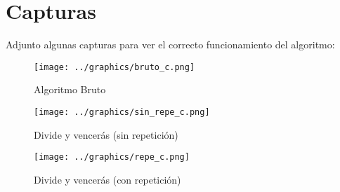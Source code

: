\documentclass[11pt]{article}
\begin{document}
\section{Capturas}
Adjunto algunas capturas para ver el correcto funcionamiento del algoritmo:

\begin{figure}[h]
\centering
\texttt{[image: ../graphics/bruto\_c.png]}
\caption{Algoritmo Bruto}
\end{figure}

\begin{figure}[h]
\centering
\texttt{[image: ../graphics/sin\_repe\_c.png]}
\caption{Divide y vencerás (sin repetición)}
\end{figure}

\begin{figure}[h]
\centering
\texttt{[image: ../graphics/repe\_c.png]}
\caption{Divide y vencerás (con repetición)}
\end{figure}
\end{document}

